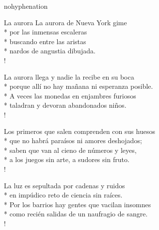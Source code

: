 \documentclass[
    a5paper,
    DIV=10,
    12pt,
    notitlepage,
    oneside,]
{scrbook} %
\begin{document}
\begin{hyphenrules}{nohyphenation}
\begin{poem}{La aurora}{}{\vspace{-1em}}
La aurora de Nueva York gime\\*
por las inmensas escaleras\\*
buscando entre las aristas\\*
nardos de angustia dibujada.\\!

La aurora llega y nadie la recibe en su boca\\*
porque allí no hay mañana ni esperanza posible.\\*
A veces las monedas en enjambres furiosos\\*
taladran y devoran abandonados niños.\\!

Los primeros que salen comprenden con sus huesos\\*
que no habrá paraísos ni amores deshojados;\\*
saben que van al cieno de números y leyes,\\*
a los juegos sin arte, a sudores sin fruto.\\!

La luz es sepultada por cadenas y ruidos\\*
en impúdico reto de ciencia sin raíces.\\*
Por los barrios hay gentes que vacilan insomnes\\*
como recién salidas de un naufragio de sangre.\\!

\end{poem}


\end{hyphenrules}
\end{document}
